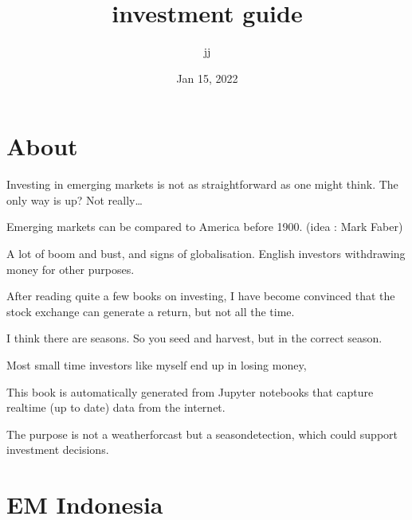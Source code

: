 \documentclass[letterpaper,10pt,english]{sphinxmanual}
\title{investment guide}
\date{Jan 15, 2022}
\author{jj}
\begin{document}
\pagestyle{empty}
\sphinxmaketitle
\pagestyle{plain}
\sphinxtableofcontents
\pagestyle{normal}
\label{\detokenize{index::doc}}



\chapter{About}
\label{\detokenize{about:about}}\label{\detokenize{about::doc}}
\sphinxAtStartPar
Investing in emerging markets is not as straightforward as one might think.
The only way is up? Not really…

\sphinxAtStartPar
Emerging markets can be compared to America before 1900. (idea : Mark Faber)

\sphinxAtStartPar
A lot of boom and bust, and signs of globalisation.
English investors withdrawing money for other purposes.

\sphinxAtStartPar
After reading quite a few books on investing, I have become convinced that the stock exchange can generate a return, but not all the time.

\sphinxAtStartPar
I think there are seasons. So you seed and harvest, but in the correct season.

\sphinxAtStartPar
Most small time investors like myself end up in losing money,

\sphinxAtStartPar
This book is automatically generated from Jupyter notebooks that capture realtime (up to date) data from the internet.

\sphinxAtStartPar
The purpose is not a weatherforcast but a season\sphinxhyphen{}detection, which could support investment decisions.


\chapter{EM Indonesia}
\label{\detokenize{indonesia:em-indonesia}}\label{\detokenize{indonesia::doc}}
\end{document}
